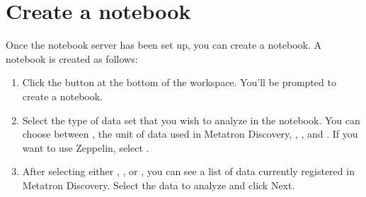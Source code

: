 \documentclass[letterpaper,10pt,english]{sphinxmanual}
\begin{document}
\section{Create a notebook}
\label{\detokenize{discovery/part05/create_a_notebook:id1}}\label{\detokenize{discovery/part05/create_a_notebook::doc}}
Once the notebook server has been set up, you can create a notebook. A notebook is created as follows:
\begin{enumerate}
\def\theenumi{\arabic{enumi}}
\def\labelenumi{\theenumi .}
\makeatletter\def\p@enumii{\p@enumi \theenumi .}\makeatother
\item {} 
Click the  button at the bottom of the workspace. You’ll be prompted to create a notebook.
\begin{quote}

\begin{figure}[H]
\centering

\noindent{}
\end{figure}
\end{quote}

\item {} 
Select the type of data set that you wish to analyze in the notebook. You can choose between , the unit of data used in Metatron Discovery, , , and . If you want to use Zeppelin, select .
\begin{quote}

\begin{figure}[H]
\centering

\noindent{}
\end{figure}
\end{quote}

\item {} 
After selecting either , , or , you can see a list of data currently registered in Metatron Discovery. Select the data to analyze and click Next.
\begin{quote}

\begin{figure}[H]
\centering

\noindent{}
\end{figure}
\end{quote}


\end{enumerate}
\end{document}
